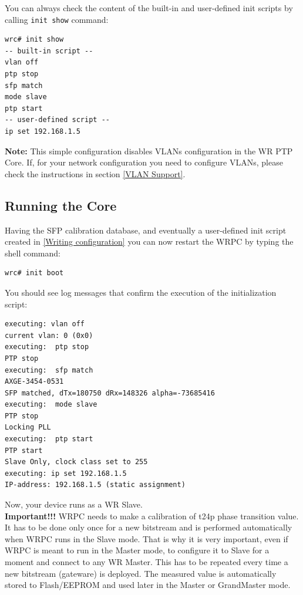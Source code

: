 \documentclass[a4paper, 12pt]{article}
\renewcommand{\_}{\underscore\allowbreak}
\begin{document}
You can always check the content of the built-in and user-defined init scripts
by calling \texttt{init show} command:
\begin{lstlisting}
wrc# init show
-- built-in script --
vlan off
ptp stop
sfp match
mode slave
ptp start
-- user-defined script --
ip set 192.168.1.5
\end{lstlisting}

\noindent\textbf{Note:} This simple configuration disables VLANs configuration
in the WR PTP Core. If, for your network configuration you need to configure
VLANs, please check the instructions in section \ref{VLAN Support}.

\subsection{Running the Core}
\label{Running the Core}

Having the SFP calibration database, and eventually a user-defined init script
created in \ref{Writing configuration} you can now restart the WRPC by typing
the shell command:

\begin{lstlisting}
wrc# init boot
\end{lstlisting}

You should see log messages that confirm the execution of the initialization
script:
\begin{minipage}{\textwidth}
\begin{lstlisting}
executing: vlan off
current vlan: 0 (0x0)
executing:  ptp stop
PTP stop
executing:  sfp match
AXGE-3454-0531  
SFP matched, dTx=180750 dRx=148326 alpha=-73685416
executing:  mode slave
PTP stop
Locking PLL
executing:  ptp start
PTP start
Slave Only, clock class set to 255
executing: ip set 192.168.1.5
IP-address: 192.168.1.5 (static assignment)
\end{lstlisting}
\end{minipage}

Now, your device runs as a WR Slave.\\

\textbf{Important!!!} WRPC needs to make a calibration of t24p phase transition
value. It has to be done only once for a new bitstream and is performed
automatically when WRPC runs in the Slave mode. That is why it is very
important, even if WRPC is meant to run in the Master mode, to configure it to
Slave for a moment and connect to any WR Master. This has to be repeated every
time a new bitstream (gateware) is deployed. The measured value is automatically
stored to Flash/EEPROM and used later in the Master or GrandMaster mode.\\
\end{document}
